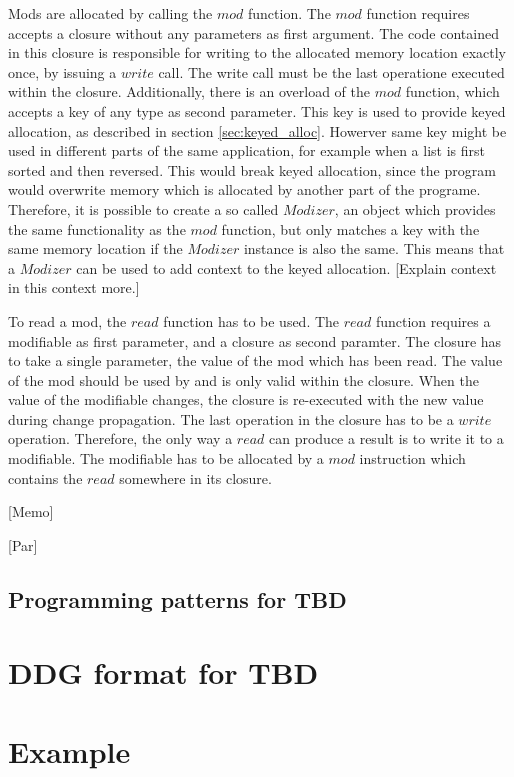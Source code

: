 Mods are allocated by calling the $mod$ function. The $mod$ function requires accepts a closure without any parameters as first argument. The code contained in this closure is responsible for writing to the allocated memory location exactly once, by issuing a $write$ call. The write call must be the last operatione executed within the closure. Additionally, there is an overload of the $mod$ function, which accepts a key of any type as second parameter. This key is used to provide keyed allocation, as described in section \ref{sec:keyed_alloc}. Howerver same key might be used in different parts of the same application, for example when a list is first sorted and then reversed. This would break keyed allocation, since the program would overwrite memory which is allocated by another part of the programe. Therefore, it is possible to create a so called $Modizer$, an object which provides the same functionality as the $mod$ function, but only matches a key with the same memory location if the $Modizer$ instance is also the same. This means that a $Modizer$ can be used to add context to the keyed allocation. [Explain context in this context more.]

To read a mod, the $read$ function has to be used. The $read$ function requires a modifiable as first parameter, and a closure as second paramter. The closure has to take a single parameter, the value of the mod which has been read. The value of the mod should be used by and is only valid within the closure. When the value of the modifiable changes, the closure is re-executed with the new value during change propagation. The last operation in the closure has to be a $write$ operation. Therefore, the only way a $read$ can produce a result 
is to write it to a modifiable. The modifiable has to be allocated by a $mod$ instruction which contains the $read$ somewhere in its closure. 

[Memo]

[Par]

\subsection{Programming patterns for TBD}

\section{DDG format for TBD}

\section{Example}



